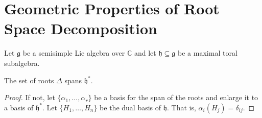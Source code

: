 \documentclass[crop=false,class=article]{standalone}                           %
\begin{document}
    \section{Geometric Properties of Root Space Decomposition}
        Let $\mathfrak{g}$ be a semisimple Lie algebra over $\mathbb{C}$ and let
        $\mathfrak{h}\subseteq\mathfrak{g}$ be a maximal toral subalgebra.
        \begin{theorem}
            The set of roots $\Delta$ spans $\mathfrak{h}^{*}$.
        \end{theorem}
        \begin{proof}
            If not, let $\{\alpha_{1},\dots,\alpha_{r}\}$ be a basis for the
            span of the roots and enlarge it to a basis of $\mathfrak{h}^{*}$.
            Let $\{H_{1},\dots,H_{n}\}$ be the dual basis of $\mathfrak{h}$.
            That is, $\alpha_{i}(H_{j})=\delta_{ij}$. 
        \end{proof}
\end{document}
